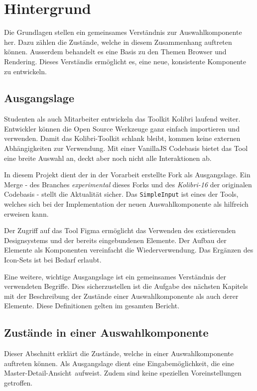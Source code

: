 \chapter{Hintergrund}
\label{chap:background}

Die Grundlagen stellen ein gemeinsames Verständnis zur Auswahlkomponente her.
Dazu zählen die Zustände, welche in diesem Zusammenhang auftreten können.
Ausserdem behandelt es eine Basis zu den Themen Browser und Rendering. 
Dieses Verständis ermöglicht es, eine neue, konsistente Komponente zu entwickeln.


\section{Ausgangslage}
\label{sec:basics}

Studenten als auch Mitarbeiter entwickeln das Toolkit Kolibri laufend weiter.
Entwickler können die Open Source Werkzeuge ganz einfach importieren und verwenden.
Damit das Kolibri-Toolkit schlank bleibt, kommen keine externen Abhängigkeiten zur Verwendung.
Mit einer VanillaJS Codebasis bietet das Tool eine breite Auswahl an, deckt aber noch nicht alle Interaktionen ab.

In diesem Projekt dient der in der Vorarbeit erstellte Fork als Ausgangslage.
Ein Merge - des Branches \emph{experimental} dieses Forks und des \emph{Kolibri-16} der originalen Codebasis - stellt die Aktualität sicher.
Das \texttt{SimpleInput} ist eines der Tools, welches sich bei der Implementation der neuen Auswahlkomponente als hilfreich erweisen kann.

Der Zugriff auf das Tool Figma ermöglicht das Verwenden des existierenden Designsystems und der bereits eingebundenen Elemente. 
Der Aufbau der Elemente als Komponenten vereinfacht die Wiederverwendung. 
Das Ergänzen des Icon-Sets ist bei Bedarf erlaubt.

Eine weitere, wichtige Ausgangslage ist ein gemeinsames Verständnis der verwendeten Begriffe. 
Dies sicherzustellen ist die Aufgabe des nächsten Kapitels mit der Beschreibung der Zustände einer Auswahlkomponente als auch derer Elemente.
Diese Definitionen gelten im gesamten Bericht.


\section{Zustände in einer Auswahlkomponente}
\label{sec:states}

Dieser Abschnitt erklärt die Zustände, welche in einer Auswahlkomponente auftreten können.
Als Ausgangslage dient eine Eingabemöglichkeit, die eine Master-Detail-Ansicht\footnotemark \ aufweist.
Zudem sind keine speziellen Voreinstellungen getroffen.

